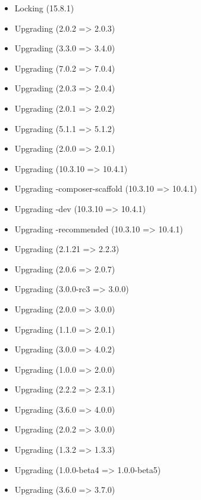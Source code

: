     \begin{itemize}
        \item Locking  (15.8.1)
        \item Upgrading  (2.0.2 => 2.0.3)
        \item Upgrading  (3.3.0 => 3.4.0)
        \item Upgrading  (7.0.2 => 7.0.4)
        \item Upgrading  (2.0.3 => 2.0.4)
        \item Upgrading  (2.0.1 => 2.0.2)
        \item Upgrading  (5.1.1 => 5.1.2)
        \item Upgrading  (2.0.0 => 2.0.1)
        \item Upgrading  (10.3.10 => 10.4.1)
        \item Upgrading -composer-scaffold (10.3.10 => 10.4.1)
        \item Upgrading -dev (10.3.10 => 10.4.1)
        \item Upgrading -recommended (10.3.10 => 10.4.1)
        \item Upgrading  (2.1.21 => 2.2.3)
        \item Upgrading  (2.0.6 => 2.0.7)
        \item Upgrading  (3.0.0-rc3 => 3.0.0)
        \item Upgrading  (2.0.0 => 3.0.0)
        \item Upgrading  (1.1.0 => 2.0.1)
        \item Upgrading  (3.0.0 => 4.0.2)
        \item Upgrading  (1.0.0 => 2.0.0)
        \item Upgrading  (2.2.2 => 2.3.1)
        \item Upgrading  (3.6.0 => 4.0.0)
        \item Upgrading  (2.0.2 => 3.0.0)
        \item Upgrading  (1.3.2 => 1.3.3)
        \item Upgrading  (1.0.0-beta4 => 1.0.0-beta5)
        \item Upgrading  (3.6.0 => 3.7.0)

\end{itemize}
